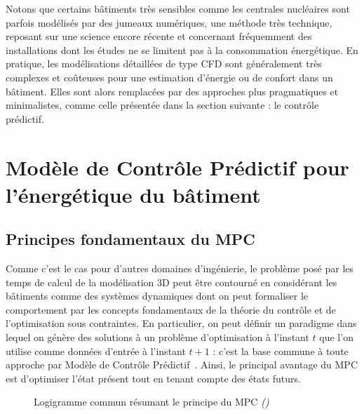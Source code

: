     Notons que certains bâtiments très sensibles comme les centrales nucléaires sont parfois
    modélisés par des jumeaux numériques, une méthode très technique, reposant sur une science
    encore récente et concernant fréquemment des installations dont les études ne se limitent pas à la
    consommation énergétique\cite{DT}.
    En pratique, les modélisations détaillées de type CFD sont généralement très complexes et coûteuses pour une estimation d'énergie ou de confort dans un bâtiment.
    Elles sont alors remplacées par des approches plus pragmatiques et minimalistes, comme celle présentée dans la section suivante : le contrôle prédictif.

\newpage
\section{Modèle de Contrôle Prédictif pour l'énergétique du bâtiment}\label{sec:modele-de-controle-predictif-pour-l'energetique-du-batiment}

    \subsection{Principes fondamentaux du MPC}\label{subsec:principes-fondamentaux-du-mpc}

        Comme c'est le cas pour d'autres domaines d'ingénierie, le problème posé par les
        temps de calcul de la modélisation 3D peut être contourné en considérant les
        bâtiments comme des systèmes dynamiques dont on peut formaliser le comportement
        par les concepts fondamentaux de la théorie du contrôle et de l'optimisation sous contraintes.
        En particulier, on peut définir un paradigme dans lequel on génère des solutions à
        un problème d'optimisation à l'instant $t$ que l'on utilise comme données d'entrée à
        l'instant $t+1$ : c'est la base commune à toute approche par Modèle de Contrôle
        Prédictif~\cite[chap.~I]{MPC_needs}.
        Ainsi, le principal avantage du MPC est
        d'optimiser l'état présent tout en tenant
        compte des états futurs\cite{wiki_MPC}.

        \begin{figure}[H]
            \centering
            \fbox{}
            \caption{Logigramme commun résumant le principe du MPC \it{(\cite{MPC_needs})}}
            \label{fig:MPC}
        \end{figure}


